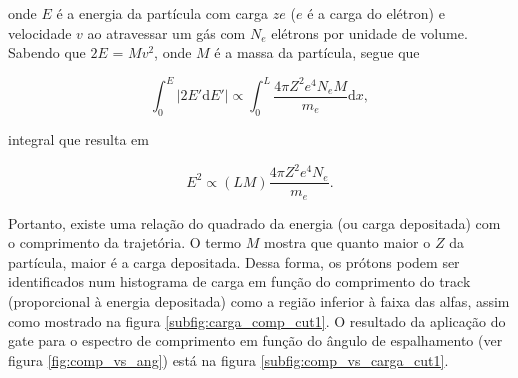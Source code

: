 \documentclass[a4paper,12pt,oneside]{book}
\begin{document}

\par onde $E$ é a energia da partícula com carga $ze$ ($e$ é a carga do elétron) e velocidade $v$ ao atravessar um gás com $N_e$ elétrons por unidade de volume. Sabendo que $2E$ = $Mv^2$, onde $M$ é a massa da partícula, segue que

\begin{equation}\label{eq:bethe_block_low_energies_2}
	\int^{E}_0 \left | 2E'\mathrm{d}E' \right | \propto \int^{L}_0 \frac{4\pi Z^2  e^4 N_e M}{m_e} \mathrm{d}x,
\end{equation}

\par integral que resulta em

\begin{equation}\label{eq:bethe_block_low_energies_3}
	E^2 \propto (LM)\frac{4\pi Z^2  e^4 N_e}{m_e}.
\end{equation}

\par Portanto, existe uma relação do quadrado da energia (ou carga depositada) com o comprimento da trajetória. O termo $M$ mostra que quanto maior o $Z$ da partícula, maior é a carga depositada. Dessa forma, os prótons podem ser identificados num histograma de carga em função do comprimento do track (proporcional à energia depositada) como a região inferior à faixa das alfas, assim como mostrado na figura \ref{subfig:carga_comp_cut1}. O resultado da aplicação do gate para o espectro de comprimento em função do ângulo de espalhamento (ver figura \ref{fig:comp_vs_ang}) está na figura \ref{subfig:comp_vs_carga_cut1}.
\end{document}
